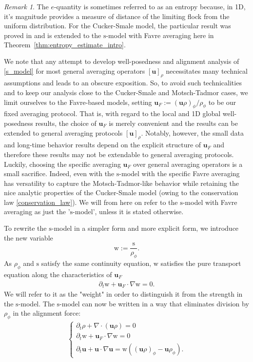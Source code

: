 \documentclass[11pt,letterpaper]{amsart}
\theoremstyle{plain}
\theoremstyle{definition}
\theoremstyle{remark}
\newtheorem{remark}[THEOREM]{Remark}
\newcommand{\thm}[1]{Theorem~\ref{#1}}
\def\u{\textbf{u}}
\def \st {\mathrm{s}}
\def \wt {\mathrm{w}}
\begin{document}
\begin{remark}
    The $e$-quantity is sometimes referred to as an entropy because, in 1D, it's magnitude provides a measure of distance 
    of the limiting flock from the uniform distribution.  For the Cucker-Smale model, the particular result was proved in \cite{LS-entropy} 
    and is extended to the $\st$-model with Favre averaging here in \thm{thm:entropy_estimate_intro}. 
\end{remark}

We note that any attempt to develop well-posedness and alignment analysis of \eqref{s_model} for most general averaging operators $[\u]_{\rho}$ necessitates many technical assumptions and leads to an obscure exposition. 
So, to avoid such technicalities and to keep our analysis close to the Cucker-Smale and Motsch-Tadmor cases, we limit ourselves to the Favre-based models, setting $\u_F := (\u \rho)_{\phi} / \rho_{\phi}$ to be our fixed averaging protocol.
That is, with regard to the local and 1D global well-posedness results, the choice of $\u_F$ is merely convenient and the results can be extended to general averaging protocols $[\u]_{\rho}$. 
Notably, however, the small data and long-time behavior results depend on the explicit structure of $\u_F$ and therefore these results may not be extendable to general averaging protocols. 
Luckily, choosing the specific averaging $\u_F$ over general averaging operators is a small sacrifice.
Indeed, even with the $\st$-model with the specific Favre averaging has versatility to capture the Motsch-Tadmor-like behavior while retaining the nice analytic properties of the 
Cucker-Smale model (owing to the conservation law \eqref{conservation_law}).
We will from here on refer to the $\st$-model with Favre averaging as just the '$\st$-model', unless it is stated otherwise. 

To rewrite the $\st$-model in a simpler form and more explicit form,  
we introduce the new variable 
\[
\wt := \frac{\st}{\rho_{\phi}}.
\]
  As $\rho_{\phi}$ and $\st$ satisfy the 
same continuity equation, $\wt$ satisfies the pure transport equation along the characteristics of $\u_F$
\begin{align*}
    \partial_t \wt + \u_F \cdot \nabla \wt = 0.
\end{align*}
 We will  refer to it as the "weight" in order to distinguish it from the strength in the $\st$-model.  The $\st$-model can now be written in a way that eliminates division by $\rho_\phi$ in the alignment force:
\begin{align*}
    \label{EAS_WM}
    \tag{WM}
    \begin{cases}
        \partial_t \rho + \nabla \cdot (\u\rho) = 0 \\
        \partial_t \wt + \u_F \cdot \nabla \wt = 0 \\
        \partial_t \u + \u \cdot \nabla \u  = \wt ((\u \rho)_{\phi} - \u \rho_{\phi}).
    \end{cases}
\end{align*}
\end{document}
